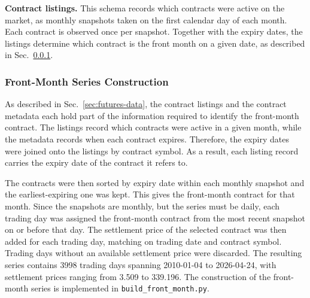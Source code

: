 \textbf{Contract listings.} This schema records which contracts were active on the market, as monthly snapshots taken on the first calendar day of each month. Each contract is observed once per snapshot. Together with the expiry dates, the listings determine which contract is the front month on a given date, as described in Sec.~\ref{sec:m1-construction}.

\subsubsection{Front-Month Series Construction}\label{sec:m1-construction}
As described in Sec.~\ref{sec:futures-data}, the contract listings and the
contract metadata each hold part of the information required to identify
the front-month contract. The listings record which contracts were active in a
given month, while the metadata records when each contract expires. Therefore, the expiry dates were joined onto the listings by contract symbol. As a result, each listing record carries the expiry date of the contract it refers to.

The contracts were then sorted by expiry date within each monthly snapshot and the earliest-expiring one was kept. This gives the front-month contract for that month. Since the snapshots are monthly, but the series must be daily, each trading day was assigned the front-month contract from the most recent snapshot on or before that day.
The settlement price of the selected contract was then added for each trading day, matching on trading date and contract symbol. Trading days without an available settlement price were discarded. The resulting series contains \num{3998} trading days spanning 2010-01-04 to 2026-04-24, with settlement prices ranging from \SI{3.509}{\eurmwh} to \SI{339.196}{\eurmwh}. The construction of the front-month series is implemented in \texttt{build\_front\_month.py}.


